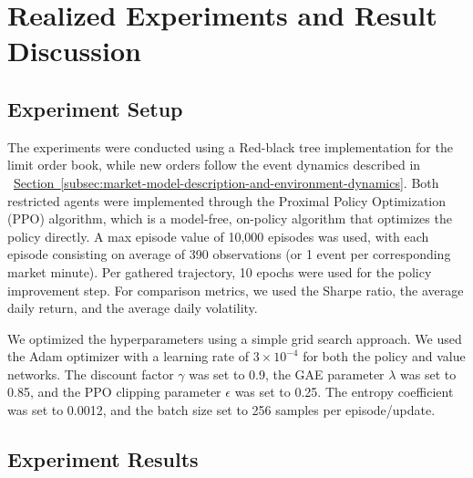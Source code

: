 \section{Realized Experiments and Result Discussion}
\label{sec:realized-experiments-and-result-discussion}

\subsection{Experiment Setup}
\label{subsec:experiment-setup}

The experiments were conducted using a Red-black tree implementation for the limit order book, while new orders follow the event dynamics described in
~\hyperref[subsec:market-model-description-and-environment-dynamics]{Section~\ref*{subsec:market-model-description-and-environment-dynamics}}.
Both restricted agents were implemented through the Proximal Policy Optimization (PPO) algorithm, which is a model-free, on-policy algorithm that optimizes the policy directly.
A max episode value of 10,000 episodes was used, with each episode consisting on average of 390 observations (or 1 event per corresponding market minute).
Per gathered trajectory, 10 epochs were used for the policy improvement step.
For comparison metrics, we used the Sharpe ratio, the average daily return, and the average daily volatility.

We optimized the hyperparameters using a simple grid search approach.
We used the Adam optimizer with a learning rate of $3 \times 10^{-4}$ for both the policy and value networks.
The discount factor $\gamma$ was set to 0.9, the GAE parameter $\lambda$ was set to 0.85, and the PPO clipping parameter $\epsilon$ was set to 0.25.
The entropy coefficient was set to 0.0012, and the batch size set to 256 samples per episode/update.

\subsection{Experiment Results}
\label{subsec:experiment-results}


